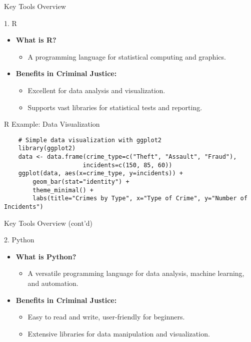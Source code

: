 \documentclass[aspectratio=169]{beamer}
\begin{document}
\begin{frame}{Key Tools Overview}
    \begin{block}{1. R}
        \begin{itemize}
            \item \textbf{What is R?} 
            \begin{itemize}
                \item A programming language for statistical computing and graphics.
            \end{itemize}
            \item \textbf{Benefits in Criminal Justice:} 
            \begin{itemize}
                \item Excellent for data analysis and visualization.
                \item Supports vast libraries for statistical tests and reporting.
            \end{itemize}
        \end{itemize}
    \end{block}
\end{frame}

\begin{frame}[fragile]{R Example: Data Visualization}
    \begin{lstlisting}
    # Simple data visualization with ggplot2
    library(ggplot2)
    data <- data.frame(crime_type=c("Theft", "Assault", "Fraud"),
                      incidents=c(150, 85, 60))
    ggplot(data, aes(x=crime_type, y=incidents)) + 
        geom_bar(stat="identity") + 
        theme_minimal() + 
        labs(title="Crimes by Type", x="Type of Crime", y="Number of Incidents")
    \end{lstlisting}
\end{frame}

\begin{frame}{Key Tools Overview (cont'd)}
    \begin{block}{2. Python}
        \begin{itemize}
            \item \textbf{What is Python?} 
            \begin{itemize}
                \item A versatile programming language for data analysis, machine learning, and automation.
            \end{itemize}
            \item \textbf{Benefits in Criminal Justice:} 
            \begin{itemize}
                \item Easy to read and write, user-friendly for beginners.
                \item Extensive libraries for data manipulation and visualization.
            \end{itemize}
        \end{itemize}
    \end{block}
\end{frame}
\end{document}
